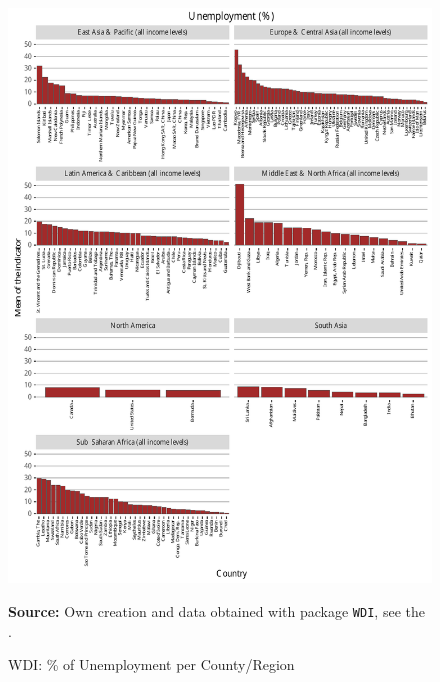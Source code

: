 \begin{figure}[H]
\begin{center}
\caption{WDI: \% of Unemployment per County/Region}
\label{fig_wdi_unemp}
\includegraphics[max height=.9\textheight]{../img/wdi_unemployment_perc.pdf}
\end{center}
\noindent \footnotesize{\textbf{Source:} Own creation and data obtained with package \texttt{WDI}, see the \cite{wb_r}.}
\end{figure}

